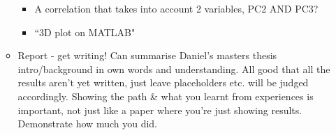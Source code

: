 \documentclass{article}
\begin{document}
\begin{itemize}
\begin{itemize}
        \begin{itemize}
            \item A correlation that takes into account 2 variables, PC2 AND PC3? 
            \item ``3D plot on MATLAB"
        \end{itemize}
        \item Report - get writing! Can summarise Daniel's masters thesis intro/background in own words and understanding. All good that all the results aren't yet written, just leave placeholders etc. will be judged accordingly. Showing the path & what you learnt from experiences is important, not just like a paper where you're just showing results. Demonstrate how much you did.
    \end{itemize}
\end{itemize}
\end{document}
